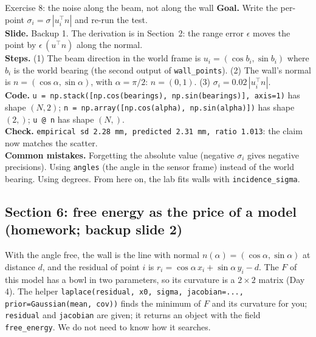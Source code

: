 \documentclass[11pt]{article}
\begin{document}
\begin{labhelp}{Exercise 8: the noise along the beam, not along the wall}
\textbf{Goal.} Write the per-point $\sigma_i=\sigma\,|u_i^\top n|$ and re-run the test.\\
\textbf{Slide.} Backup 1. The derivation is in Section~2: the range error $\epsilon$ moves the point by $\epsilon\,(u^\top n)$ along the normal.\\
\textbf{Steps.} (1) The beam direction in the world frame is $u_i=(\cos b_i,\sin b_i)$ where $b_i$ is the world bearing (the second output of \texttt{wall\_points}). (2) The wall's normal is $n=(\cos\alpha,\sin\alpha)$, with $\alpha=\pi/2$: $n=(0,1)$. (3) $\sigma_i=0.02\,|u_i^\top n|$.\\
\textbf{Code.} \texttt{u = np.stack([np.cos(bearings), np.sin(bearings)], axis=1)} has shape $(N,2)$; \texttt{n = np.array([np.cos(alpha), np.sin(alpha)])} has shape $(2,)$; \texttt{u @ n} has shape $(N,)$.\\
\textbf{Check.} \texttt{empirical sd 2.28 mm, predicted 2.31 mm, ratio 1.013}: the claim now matches the scatter.\\
\textbf{Common mistakes.} Forgetting the absolute value (negative $\sigma_i$ gives negative precisions). Using \texttt{angles} (the angle in the sensor frame) instead of the world bearing. Using degrees. From here on, the lab fits walls with \texttt{incidence\_sigma}.
\end{labhelp}

\subsection*{Section 6: free energy as the price of a model (homework; backup slide 2)}
With the angle free, the wall is the line with normal $n(\alpha)=(\cos\alpha,\sin\alpha)$ at distance $d$, and the residual of point $i$ is $r_i=\cos\alpha\,x_i+\sin\alpha\,y_i-d$. The $F$ of this model has a bowl in two parameters, so its curvature is a $2\times2$ matrix (Day 4). The helper \texttt{laplace(residual, x0, sigma, jacobian=..., prior=Gaussian(mean, cov))} finds the minimum of $F$ and its curvature for you; \texttt{residual} and \texttt{jacobian} are given; it returns an object with the field \texttt{free\_energy}. We do not need to know how it searches.
\end{document}
